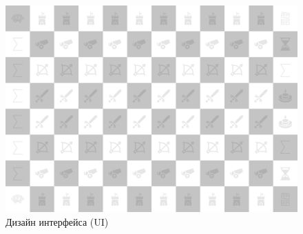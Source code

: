 \documentclass[12pt, a4paper, simple]{eskdtext}
\begin{document}
    \begin{figure}[!h]
        \centering
        \includegraphics[width=12cm]
            {../sources/game_ux/build/game_ui.png}
        \caption{Дизайн интерфейса (UI)}
    \end{figure}
\end{document}

